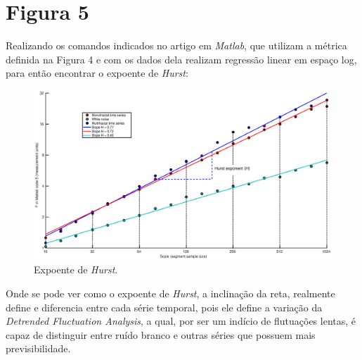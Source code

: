 \documentclass{article}[twocolumn]
\begin{document}
	\section{Figura 5}
	Realizando os comandos indicados no artigo em \textit{Matlab}, que utilizam a m\'etrica
	definida na Figura 4 e com os dados dela realizam regress\~ao linear em espa\c{c}o log,
	para ent\~ao encontrar o expoente de \textit{Hurst}:
	\begin{figure}[H]
		\centering
		\includegraphics[width=12cm]{fig5.eps}
		\caption{Expoente de \textit{Hurst}.}
	\end{figure}
	Onde se pode ver como o expoente de \textit{Hurst}, a inclina\c{c}\~ao da reta, realmente
	define e diferencia entre cada s\'erie temporal, pois ele define a varia\c{c}\~ao
	da \textit{Detrended Fluctuation Analysis}, a qual, por ser um ind\'icio de flutua\c{c}\~oes
	lentas, \'e capaz de distinguir entre ru\'ido branco e outras s\'eries que possuem
	mais previsibilidade.
\end{document}
